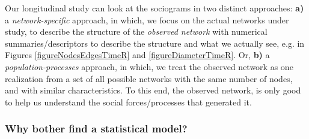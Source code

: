 \documentclass{acm_proc_article-sp}
\begin{document}
Our longitudinal study can look at the sociograms in two distinct approaches: \textbf{a)} a \textit{network-specific} approach, in which, we focus on the actual networks under study, to describe the structure of the \textit{observed network} with numerical summaries/descriptors to describe the structure and what we actually see, e.g. in Figures \ref{figureNodesEdgesTimeR} and \ref{figureDiameterTimeR}. Or, \textbf{b)} a \textit{population-processes} approach, in which, we treat the observed network as one realization from a set of all possible networks with the same number of nodes, and with similar characteristics. To this end, the observed network, is only good to help us understand the social forces/processes that generated it. 

\subsubsection{Why bother find a statistical model?}
\end{document}

